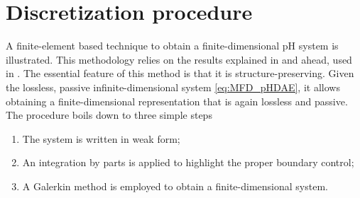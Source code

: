 \documentclass{svjour3}                     %
\begin{document}
\section{Discretization procedure}
\label{sec:discr}
A finite-element based technique to obtain a finite-dimensional pH system is illustrated. This methodology relies on the results explained in \cite{cardoso2019partitioned} and ahead, used in \cite{BRUGNOLI2019940,BRUGNOLI2019961}. The essential feature of this method is that it is structure-preserving. Given the lossless, passive infinite-dimensional system \eqref{eq:MFD_pHDAE}, it allows obtaining a finite-dimensional representation that is again lossless and passive. The procedure boils down to three simple steps
\begin{enumerate}
	\item The system is written in weak form; 
	\item An integration by parts is applied to highlight the proper boundary control;
	\item A Galerkin method is employed to obtain a finite-dimensional system.
\end{enumerate}
\end{document}
